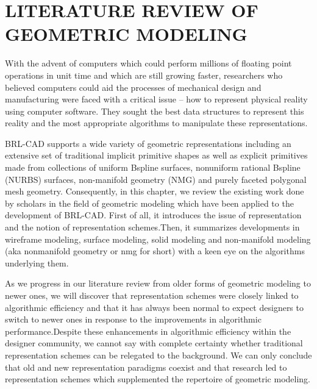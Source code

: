 
\chapter{LITERATURE REVIEW OF GEOMETRIC MODELING} %

\label{Literature Review} %


\hspace{30} With the advent of computers which could perform millions of floating
point operations in unit time and which are still growing faster, researchers who
believed computers could aid the processes of mechanical design and
manufacturing were faced with a critical issue – how to represent physical
reality using computer software. They sought the best data structures to
represent this reality and the most appropriate algorithms to manipulate these representations.

\hspace{30} BRL-­CAD supports a wide variety of geometric representations including an 
extensive set of traditional implicit primitive shapes as well as explicit primitives
made from collections of uniform B­spline surfaces, non­uniform rational B­spline (NURBS)
surfaces, n­on-manifold   geometry   (NMG)   and purely faceted polygonal mesh geometry.
Consequently, in this chapter, we review the existing work done by scholars in the 
field of geometric modeling which have been applied to the development of BRL-­CAD. 
First of all, it introduces the issue of representation and the notion of representation
 schemes.Then, it summarizes developments in wireframe modeling, surface modeling, solid
modeling and non­-manifold modeling (aka non­manifold geometry or nmg for short) with a keen
 eye on the algorithms underlying them.

\hspace{30} As we progress in our literature review from older forms of geometric
modeling to newer ones, we will discover that representation schemes were
closely linked to algorithmic efficiency and that it has always been normal to
expect designers to switch to newer ones in response to the improvements in
algorithmic performance.Despite these enhancements in algorithmic efficiency
within the designer community, we cannot say with complete certainty whether
traditional representation schemes can be relegated to the background. We
can only conclude that old and new representation paradigms co­exist and that
research led to representation schemes which supplemented the repertoire of
geometric modeling.  

